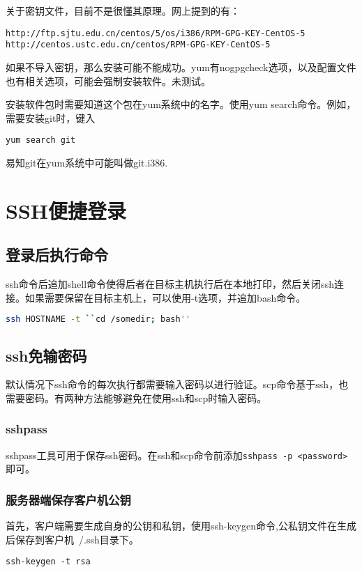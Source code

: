 关于密钥文件，目前不是很懂其原理。网上提到的有：
\begin{verbatim}
http://ftp.sjtu.edu.cn/centos/5/os/i386/RPM-GPG-KEY-CentOS-5
http://centos.ustc.edu.cn/centos/RPM-GPG-KEY-CentOS-5
\end{verbatim}
如果不导入密钥，那么安装可能不能成功。yum有nogpgcheck选项，以及配置文件也有相关选项，可能会强制安装软件。未测试。

安装软件包时需要知道这个包在yum系统中的名字。使用yum search命令。例如，需要安装git时，键入
\begin{verbatim}
yum search git
\end{verbatim}
易知git在yum系统中可能叫做git.i386.

\section{SSH便捷登录}

\subsection{登录后执行命令}
ssh命令后追加shell命令使得后者在目标主机执行后在本地打印，然后关闭ssh连接。如果需要保留在目标主机上，可以使用-t选项，并追加bash命令。
\begin{lstlisting}[language=bash]
   ssh HOSTNAME -t ``cd /somedir; bash'' 
\end{lstlisting}

\subsection{ssh免输密码}

默认情况下ssh命令的每次执行都需要输入密码以进行验证。scp命令基于ssh，也需要密码。有两种方法能够避免在使用ssh和scp时输入密码。

\subsubsection{sshpass}
sshpass工具可用于保存ssh密码。在ssh和scp命令前添加\verb+sshpass -p <password>+即可。

\subsubsection{服务器端保存客户机公钥}
首先，客户端需要生成自身的公钥和私钥，使用ssh-keygen命令,公私钥文件在生成后保存到客户机~/.ssh目录下。
\begin{verbatim}
ssh-keygen -t rsa
\end{verbatim}

